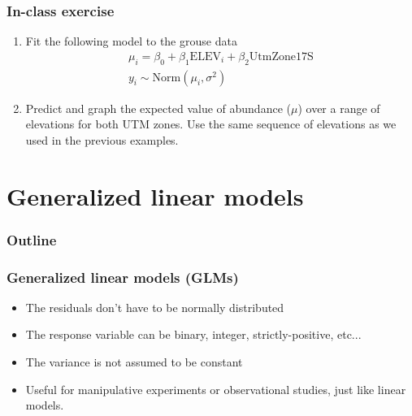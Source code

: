 \documentclass[color=usenames,dvipsnames]{beamer}\usepackage[]{graphicx}\usepackage[]{color}
\begin{document}
\begin{frame}
  \frametitle{In-class exercise}
  \begin{enumerate}
    \item Fit the following model to the grouse data
      \begin{gather*}
        \mu_i = \beta_0 + \beta_1\mathrm{ELEV}_i + \beta_2\mathrm{UtmZone17S}\\
        y_i \sim \mathrm{Norm}(\mu_i,\sigma^2)
      \end{gather*}
    \item Predict and graph the expected value of abundance ($\mu$)
      over a range of elevations for both UTM zones. Use the same
      sequence of elevations as we used in the previous examples.
  \end{enumerate}
\end{frame}






\section{Generalized linear models}



\begin{frame}[plain]
  \frametitle{Outline}
  \Large
  \tableofcontents[currentsection]
\end{frame}




\begin{frame}
  \frametitle{Generalized linear models (GLMs)}
  \large
  \begin{itemize}%
    \item<2-> The residuals don't have to be normally distributed
    \item<3-> The response variable can be binary, integer,
      strictly-positive, etc...
    \item<4-> The variance is not assumed to be constant
    \item<5-> Useful for manipulative experiments or observational
      studies, just like linear models.
  \end{itemize}
  \vfill
\end{frame}
\end{document}
